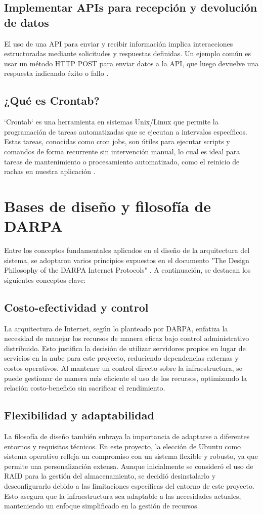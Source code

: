 \subsection{Implementar APIs para recepción y devolución de datos}
El uso de una API para enviar y recibir información implica interacciones estructuradas mediante solicitudes y respuestas definidas. Un ejemplo común es usar un método HTTP POST para enviar datos a la API, que luego devuelve una respuesta indicando éxito o fallo \cite{ImplementarAPIDatos}.

\subsection{¿Qué es Crontab?}
`Crontab` es una herramienta en sistemas Unix/Linux que permite la programación de tareas automatizadas que se ejecutan a intervalos específicos. Estas tareas, conocidas como cron jobs, son útiles para ejecutar scripts y comandos de forma recurrente sin intervención manual, lo cual es ideal para tareas de mantenimiento o procesamiento automatizado, como el reinicio de rachas en nuestra aplicación \cite{HostingerCrontabTutorial}.

\section{Bases de diseño y filosofía de DARPA}
Entre los conceptos fundamentales aplicados en el diseño de la arquitectura del sistema, se adoptaron varios principios expuestos en el documento "The Design Philosophy of the DARPA Internet Protocols" \cite{DARPA}. A continuación, se destacan los siguientes conceptos clave:

\subsection{Costo-efectividad y control}
La arquitectura de Internet, según lo planteado por DARPA, enfatiza la necesidad de manejar los recursos de manera eficaz bajo control administrativo distribuido. Esto justifica la decisión de utilizar servidores propios en lugar de servicios en la nube para este proyecto, reduciendo dependencias externas y costos operativos. Al mantener un control directo sobre la infraestructura, se puede gestionar de manera más eficiente el uso de los recursos, optimizando la relación costo-beneficio sin sacrificar el rendimiento.

\subsection{Flexibilidad y adaptabilidad}
La filosofía de diseño también subraya la importancia de adaptarse a diferentes entornos y requisitos técnicos. En este proyecto, la elección de Ubuntu como sistema operativo refleja un compromiso con un sistema flexible y robusto, ya que permite una personalización extensa. Aunque inicialmente se consideró el uso de RAID para la gestión del almacenamiento, se decidió desinstalarlo y desconfigurarlo debido a las limitaciones específicas del entorno de este proyecto. Esto asegura que la infraestructura sea adaptable a las necesidades actuales, manteniendo un enfoque simplificado en la gestión de recursos.

